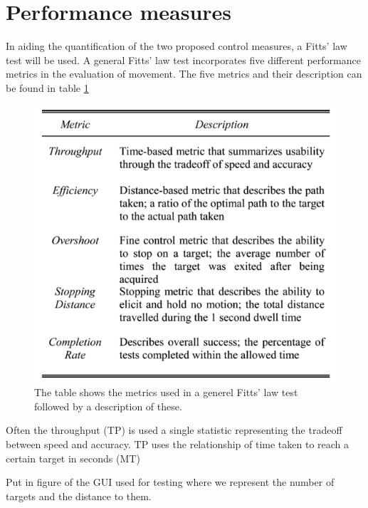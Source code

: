 

\section{Performance measures}
In aiding the quantification of the two proposed control measures, a Fitts' law test will be used. A general Fitts' law test incorporates five different performance metrics in the evaluation of movement.\cite{Kamavuako2014,Scheme2013} The five metrics and their description can be found in table \ref{fig:Fitts}    

  \begin{figure}[H]                                         
  	\includegraphics[width=.4\textwidth]{figures/Fitt}  
  	\caption{The table shows the metrics used in a generel Fitts' law test followed by a description of these.\cite{Scheme2013}}
  	\label{fig:Fitts} 
  \end{figure}

Often the throughput (TP) is used a single statistic representing the tradeoff between speed and accuracy. TP uses the relationship of time taken to reach a certain target in seconds (MT)   

\cite{Scheme2013} 

Put in figure of the GUI used for testing where we represent the number of targets and the distance to them. 

 